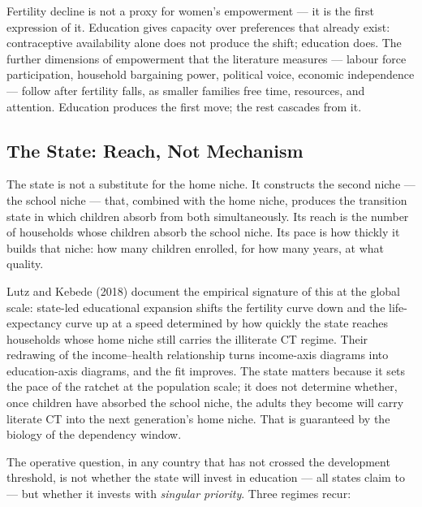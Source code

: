 \documentclass[12pt,letterpaper]{article}
\begin{document}
Fertility decline is not a proxy for women's empowerment --- it is the
first expression of it. Education gives capacity over preferences that
already exist: contraceptive availability alone does not produce the
shift; education does. The further dimensions of empowerment that the
literature measures --- labour force participation, household
bargaining power, political voice, economic independence --- follow
after fertility falls, as smaller families free time, resources, and
attention. Education produces the first move; the rest cascades from it.

\subsection{The State: Reach, Not Mechanism}\label{the-state-reach-not-mechanism}

The state is not a substitute for the home niche. It constructs the
second niche --- the school niche --- that, combined with the home
niche, produces the transition state in which children absorb from
both simultaneously. Its reach is the number of households whose
children absorb the school niche. Its pace is how thickly it builds
that niche: how many children enrolled, for how many years, at what
quality.

Lutz and Kebede (2018) document the empirical signature of this at
the global scale: state-led educational expansion shifts the
fertility curve down and the life-expectancy curve up at a speed
determined by how quickly the state reaches households whose home
niche still carries the illiterate CT regime. Their redrawing of the
income--health relationship turns income-axis diagrams into
education-axis diagrams, and the fit improves. The state matters
because it sets the pace of the ratchet at the population scale; it
does not determine whether, once children have absorbed the school
niche, the adults they become will carry literate CT into the next
generation's home niche. That is guaranteed by the biology of the
dependency window.

The operative question, in any country that has not crossed the
development threshold, is not whether the state will invest in
education --- all states claim to --- but whether it invests with
\emph{singular priority}. Three regimes recur:
\end{document}
